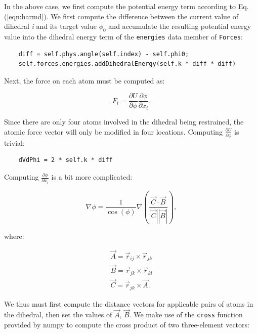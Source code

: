 \documentclass[11pt]{report}
\newcommand{\Vr}[1]{\mbox{$\vec{r}_{#1}$}}
\begin{document}
In the above case, we first compute the potential energy term
according to Eq. (\ref{eqn:harmd}).  We first compute the difference
between the current value of dihedral {\it i} and its target value
\begin{math} \phi_{0} \end{math} and accumulate the resulting 
potential energy value into the dihedral energy term of the
\texttt{energies} data member of \texttt{Forces}:

\begin{verbatim}
    diff = self.phys.angle(self.index) - self.phi0;
    self.forces.energies.addDihedralEnergy(self.k * diff * diff)
\end{verbatim}

Next, the force on each atom must be computed as:

\begin{equation}
F_{i} = \frac{\partial U}{\partial \phi} \frac{\partial \phi}{\partial x_{i}}.
\end{equation}

Since there are only four atoms involved in the dihedral
being restrained, the atomic force vector will only be modified in four 
locations.  Computing \begin{math}\frac{\partial U}{\partial \phi}\end{math}
is trivial:

\begin{verbatim}
    dVdPhi = 2 * self.k * diff
\end{verbatim} 

Computing \begin{math}\frac{\partial \phi}{\partial x_{i}}\end{math}
is a bit more complicated:

\begin{equation}
  \nabla \phi =  \frac{ 1 }{ \cos(\phi) } \nabla \left( \frac{ \vec{C}
\cdot \vec{B} }{ |\vec{C}| |\vec{B}| } \right),
\end{equation}

where:

\begin{eqnarray*}
  \vec{A} = \Vr{ij} \times \Vr{jk}   \\
  \vec{B} = \Vr{jk} \times \Vr{kl}   \\
  \vec{C} = \Vr{jk} \times \vec{A}.
\end{eqnarray*}

We thus must first compute the distance
vectors for applicable pairs of atoms in the dihedral, then
set the values of \begin{math}\vec{A}\end{math}, 
\begin{math}\vec{B}\end{math}.
We make use of the \texttt{cross} function provided by
numpy to compute the cross product of two three-element vectors:
\end{document}
